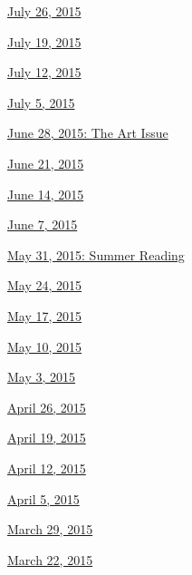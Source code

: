 \href{http://www.nytimes3xbfgragh.onion/indexes/2015/07/26/books/review/index.html}{July
26, 2015}

\href{http://www.nytimes3xbfgragh.onion/indexes/2015/07/19/books/review/index.html}{July
19, 2015}

\href{http://www.nytimes3xbfgragh.onion/indexes/2015/07/12/books/review/index.html}{July
12, 2015}

\href{http://www.nytimes3xbfgragh.onion/indexes/2015/07/05/books/review/index.html}{July
5, 2015}

\href{http://www.nytimes3xbfgragh.onion/interactive/2015/06/25/books/review/art-issue.html}{June
28, 2015: The Art Issue}

\href{http://www.nytimes3xbfgragh.onion/indexes/2015/06/21/books/review/index.html}{June
21, 2015}

\href{http://www.nytimes3xbfgragh.onion/indexes/2015/06/14/books/review/index.html}{June
14, 2015}

\href{http://www.nytimes3xbfgragh.onion/indexes/2015/06/07/books/review/index.html}{June
7, 2015}

\href{http://www.nytimes3xbfgragh.onion/indexes/2015/05/31/books/review/index.html}{May
31, 2015: Summer Reading}

\href{http://www.nytimes3xbfgragh.onion/indexes/2015/05/24/books/review/index.html}{May
24, 2015}

\href{http://www.nytimes3xbfgragh.onion/indexes/2015/05/17/books/review/index.html}{May
17, 2015}

\href{http://www.nytimes3xbfgragh.onion/indexes/2015/05/10/books/review/index.html}{May
10, 2015}

\href{http://www.nytimes3xbfgragh.onion/indexes/2015/05/03/books/review/index.html}{May
3, 2015}

\href{http://www.nytimes3xbfgragh.onion/indexes/2015/04/26/books/review/index.html}{April
26, 2015}

\href{http://www.nytimes3xbfgragh.onion/indexes/2015/04/19/books/review/index.html}{April
19, 2015}

\href{http://www.nytimes3xbfgragh.onion/indexes/2015/04/12/books/review/index.html}{April
12, 2015}

\href{http://www.nytimes3xbfgragh.onion/indexes/2015/04/05/books/review/index.html}{April
5, 2015}

\href{http://www.nytimes3xbfgragh.onion/indexes/2015/03/29/books/review/index.html}{March
29, 2015}

\href{http://www.nytimes3xbfgragh.onion/indexes/2015/03/22/books/review/index.html}{March
22, 2015}

